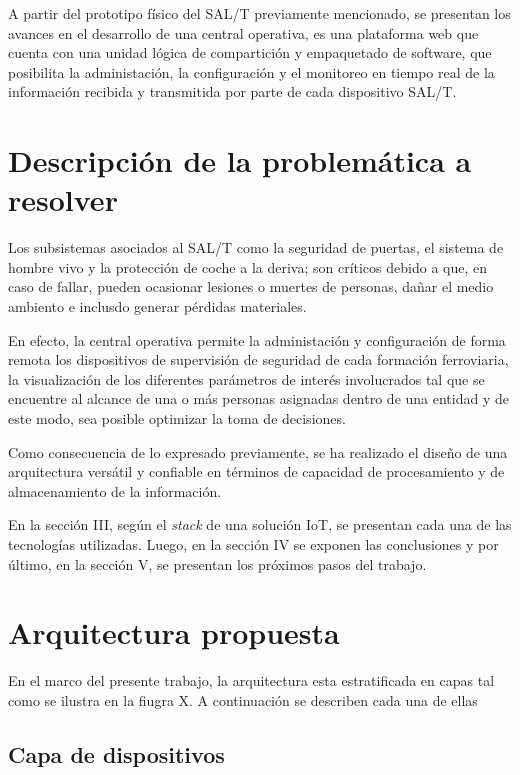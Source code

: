 \documentclass[10pt, a4paper, twocolumn]{article} %
\begin{document}
A partir del prototipo físico del SAL/T previamente mencionado, se presentan los avances en el desarrollo de una central operativa, es una plataforma web que cuenta con una unidad lógica de compartición y empaquetado de software, que posibilita la administación, la configuración y el monitoreo en tiempo real de la información recibida y transmitida por parte de cada dispositivo SAL/T.

\section{Descripción de la problemática a resolver}

Los subsistemas asociados al SAL/T como la seguridad de puertas, el sistema de hombre vivo y la protección de coche a la deriva; son críticos debido a que, en caso de fallar, pueden ocasionar lesiones o muertes de personas, dañar el medio ambiento e inclusdo generar pérdidas materiales. 

En efecto, la central operativa permite la administación y configuración de forma remota los dispositivos de supervisión de seguridad de cada formación ferroviaria, la visualización de los diferentes parámetros de interés involucrados tal que se encuentre al alcance de una o más personas asignadas dentro de una entidad y de este modo, sea posible optimizar la toma de decisiones.

Como consecuencia de lo expresado previamente, se ha realizado el diseño de una arquitectura versátil y confiable en términos de capacidad de procesamiento y de almacenamiento de la información.

En la sección III, según el \textit{stack} de una solución IoT, se presentan cada una de las tecnologías utilizadas. Luego, en la sección IV se exponen las conclusiones y por último, en la sección V, se presentan los próximos pasos del trabajo.


\section{Arquitectura propuesta}

En el marco del presente trabajo, la arquitectura esta estratificada en capas
tal como se ilustra en la fiugra X. A continuación se describen cada una de ellas

\subsection{Capa de dispositivos}
\end{document}
